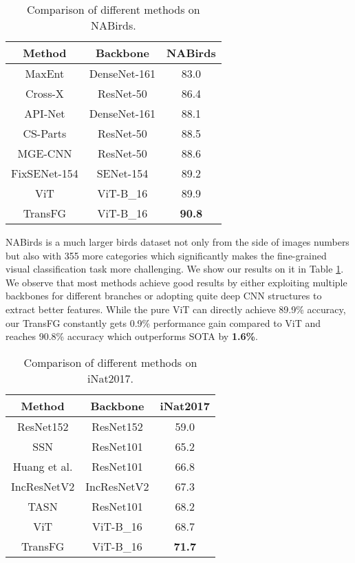 \documentclass[10pt,twocolumn,letterpaper]{article}
\begin{document}
\begin{table}[]
    \small
    \centering
    \caption{Comparison of different methods on NABirds.}
    \label{tab:na}
    \begin{tabular}{c|c|c}
    \hline
    Method & Backbone & NABirds \\ \hline
    MaxEnt \cite{NEURIPS2018_0c74b7f7} & DenseNet-161 & 83.0 \\ 
    Cross-X \cite{luo2019cross} & ResNet-50 & 86.4 \\ 
    API-Net \cite{zhuang2020learning} & DenseNet-161 & 88.1 \\ 
    CS-Parts \cite{korsch2019classification} & ResNet-50 & 88.5 \\ 
    MGE-CNN \cite{zhang2019learning} & ResNet-50 & 88.6 \\ 
    FixSENet-154 \cite{touvron2019fixing} & SENet-154 & 89.2 \\ \hline
    ViT \cite{dosovitskiy2020image} & ViT-B\_16 & 89.9 \\
    TransFG & ViT-B\_16 & \textbf{90.8} \\ \hline
    \end{tabular}
\end{table}

NABirds is a much larger birds dataset not only from the side of images numbers but also with 355 more categories which significantly makes the fine-grained visual classification task more challenging. We show our results on it in Table \ref{tab:na}. 
We observe that most methods achieve good results by either exploiting multiple backbones for different branches or adopting quite deep CNN structures to extract better features. 
While the pure ViT \cite{dosovitskiy2020image} can directly achieve 89.9\% accuracy, our TransFG constantly gets 0.9\% performance gain compared to ViT and reaches 90.8\% accuracy which outperforms SOTA by \textbf{1.6\%}.

\begin{table}[]
    \small
    \centering
    \caption{Comparison of different methods on iNat2017.}
    \label{tab:inat}
    \begin{tabular}{c|c|c}
    \hline
    Method & Backbone & iNat2017 \\ \hline
    ResNet152 \cite{he2015deep} & ResNet152 & 59.0 \\
    SSN \cite{recasens2018learning} & ResNet101 & 65.2 \\
    Huang et al. \cite{huang2020interpretable} & ResNet101 & 66.8 \\
    IncResNetV2 \cite{szegedy2017inception} & IncResNetV2 & 67.3 \\ 
    TASN \cite{zheng2019looking} & ResNet101 & 68.2 \\ \hline
    ViT \cite{dosovitskiy2020image} & ViT-B\_16 & 68.7 \\ 
    TransFG & ViT-B\_16 & \textbf{71.7} \\ \hline
    \end{tabular}
\end{table}
\end{document}
